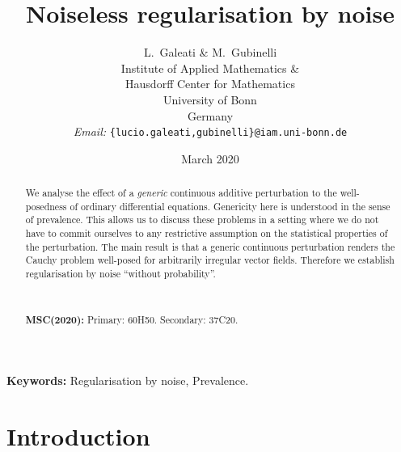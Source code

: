 \documentclass[10pt]{article}
\newcommand{\tmaffiliation}[1]{\\ #1}
\newcommand{\tmemail}[1]{\\ \textit{Email:} \texttt{#1}}
\newcommand{\tmtextbf}[1]{{\bfseries{#1}}}
\newcommand{\tmtextit}[1]{{\itshape{#1}}}
\newcommand{\tmkeywords}{\textbf{Keywords:} }
\begin{document}
\title{Noiseless regularisation by noise}

\author{
  L.~Galeati \& M.~Gubinelli
  \tmaffiliation{Institute of Applied Mathematics \&\\
  Hausdorff Center for Mathematics\\
  University of Bonn\\
  Germany}
  \tmemail{\{lucio.galeati,gubinelli\}@iam.uni-bonn.de}
}

\date{March 2020}

\maketitle

\begin{abstract}
  We analyse the effect of a \tmtextit{generic} continuous additive
  perturbation to the well-posedness of ordinary differential equations.
  Genericity here is understood in the sense of prevalence. This allows us to
  discuss these problems in a setting where we do not have to commit ourselves
  to any restrictive assumption on the statistical properties of the
  perturbation. The main result is that a generic continuous perturbation
  renders the Cauchy problem well-posed for arbitrarily irregular vector
  fields. Therefore we establish regularisation by noise ``without
  probability''.
  
  \
  
  {\noindent}\tmtextbf{MSC(2020):} Primary: 60H50. Secondary: 37C20.
\end{abstract}

\tmkeywords{Regularisation by noise, Prevalence.}

{\tableofcontents}

\section{Introduction}\label{sec1}
\end{document}
